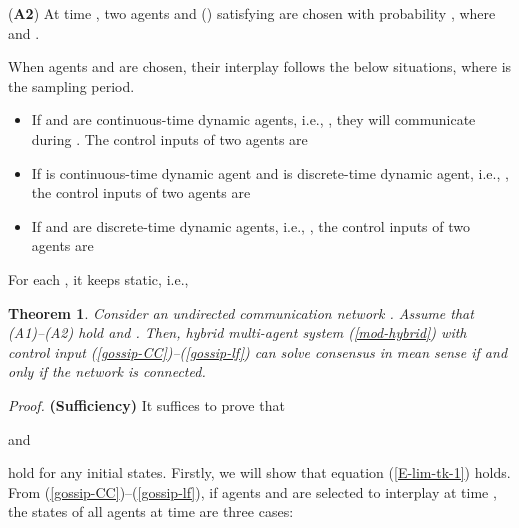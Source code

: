 \documentclass[12pt,draftcls,onecolumn]{IEEEtran}
\newtheorem{theorem}{Theorem}
\begin{document}
(\textbf{A2}) At time , two agents  and  () satisfying  are chosen with probability , where  and .

When agents  and  are chosen, their interplay follows the below situations, where  is the sampling period.
\begin{itemize}
  \item If  and  are continuous-time dynamic agents, i.e., , they will communicate during . The control inputs of two agents are
      
  \item If  is continuous-time dynamic agent and  is discrete-time dynamic agent, i.e., , the control inputs of two agents are
      
  \item If  and  are discrete-time dynamic agents, i.e., , the control inputs of two agents are
      
\end{itemize}
For each , it keeps static, i.e.,



\begin{theorem}\label{consensus-gossip}
Consider an undirected communication network . Assume that (A1)--(A2) hold and . Then, hybrid multi-agent system (\ref{mod-hybrid}) with control input (\ref{gossip-CC})--(\ref{gossip-lf}) can solve consensus in mean sense if and only if the network  is connected.
\end{theorem}
{\it Proof.} \textbf{(Sufficiency)} It suffices to prove that

and

hold for any initial states.
Firstly, we will show that equation (\ref{E-lim-tk-1}) holds. From (\ref{gossip-CC})--(\ref{gossip-lf}), if agents  and  are selected to interplay at time , the states of all agents at time  are three cases:
\end{document}
